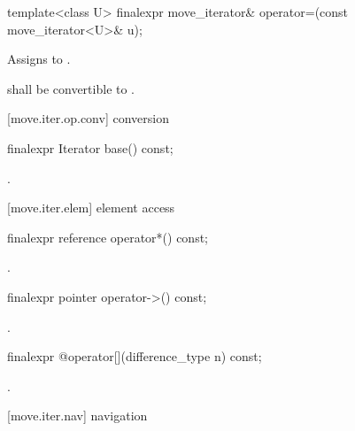 %
\begin{itemdecl}
template<class U> finalexpr move_iterator& operator=(const move_iterator<U>& u);
\end{itemdecl}

\begin{itemdescr}
\pnum
\effects Assigns  to
.

\pnum
\requires {} shall be convertible to
.
\end{itemdescr}

[move.iter.op.conv]{ conversion}

%
\begin{itemdecl}
finalexpr Iterator base() const;
\end{itemdecl}

\begin{itemdescr}
\pnum
\returns {}.
\end{itemdescr}

[move.iter.elem]{ element access}

%
\begin{itemdecl}
finalexpr reference operator*() const;
\end{itemdecl}

\begin{itemdescr}
\pnum
\returns {}.
\end{itemdescr}

%
\begin{itemdecl}
finalexpr pointer operator->() const;
\end{itemdecl}

\begin{itemdescr}
\pnum
\returns {}.
\end{itemdescr}

%
\begin{itemdecl}
finalexpr @\unspec@ operator[](difference_type n) const;
\end{itemdecl}

\begin{itemdescr}
\pnum
\returns {}.
\end{itemdescr}

[move.iter.nav]{ navigation}

